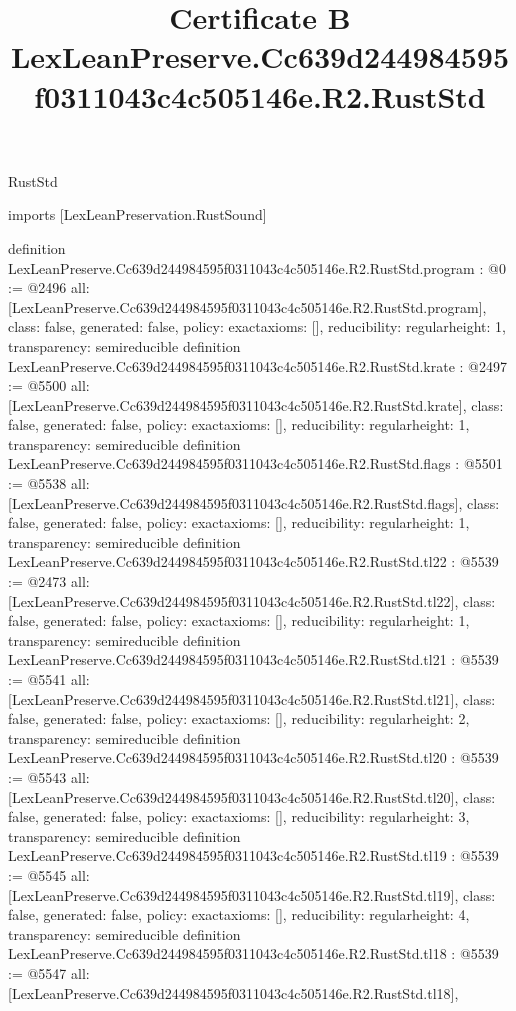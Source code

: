 \begin{lexlean}{RustStd}
\title{Certificate B LexLeanPreserve.Cc639d244984595f0311043c4c505146e.R2.RustStd}
\begin{coremodule}
imports [LexLeanPreservation.RustSound]

definition LexLeanPreserve.Cc639d244984595f0311043c4c505146e.R2.RustStd.program : @0 := @2496 {
  all: [LexLeanPreserve.Cc639d244984595f0311043c4c505146e.R2.RustStd.program],
  class: false,
  generated: false,
  policy: exact{axioms: []},
  reducibility: regular{height: 1},
  transparency: semireducible
}
definition LexLeanPreserve.Cc639d244984595f0311043c4c505146e.R2.RustStd.krate : @2497 := @5500 {
  all: [LexLeanPreserve.Cc639d244984595f0311043c4c505146e.R2.RustStd.krate],
  class: false,
  generated: false,
  policy: exact{axioms: []},
  reducibility: regular{height: 1},
  transparency: semireducible
}
definition LexLeanPreserve.Cc639d244984595f0311043c4c505146e.R2.RustStd.flags : @5501 := @5538 {
  all: [LexLeanPreserve.Cc639d244984595f0311043c4c505146e.R2.RustStd.flags],
  class: false,
  generated: false,
  policy: exact{axioms: []},
  reducibility: regular{height: 1},
  transparency: semireducible
}
definition LexLeanPreserve.Cc639d244984595f0311043c4c505146e.R2.RustStd.tl22 : @5539 := @2473 {
  all: [LexLeanPreserve.Cc639d244984595f0311043c4c505146e.R2.RustStd.tl22],
  class: false,
  generated: false,
  policy: exact{axioms: []},
  reducibility: regular{height: 1},
  transparency: semireducible
}
definition LexLeanPreserve.Cc639d244984595f0311043c4c505146e.R2.RustStd.tl21 : @5539 := @5541 {
  all: [LexLeanPreserve.Cc639d244984595f0311043c4c505146e.R2.RustStd.tl21],
  class: false,
  generated: false,
  policy: exact{axioms: []},
  reducibility: regular{height: 2},
  transparency: semireducible
}
definition LexLeanPreserve.Cc639d244984595f0311043c4c505146e.R2.RustStd.tl20 : @5539 := @5543 {
  all: [LexLeanPreserve.Cc639d244984595f0311043c4c505146e.R2.RustStd.tl20],
  class: false,
  generated: false,
  policy: exact{axioms: []},
  reducibility: regular{height: 3},
  transparency: semireducible
}
definition LexLeanPreserve.Cc639d244984595f0311043c4c505146e.R2.RustStd.tl19 : @5539 := @5545 {
  all: [LexLeanPreserve.Cc639d244984595f0311043c4c505146e.R2.RustStd.tl19],
  class: false,
  generated: false,
  policy: exact{axioms: []},
  reducibility: regular{height: 4},
  transparency: semireducible
}
definition LexLeanPreserve.Cc639d244984595f0311043c4c505146e.R2.RustStd.tl18 : @5539 := @5547 {
  all: [LexLeanPreserve.Cc639d244984595f0311043c4c505146e.R2.RustStd.tl18],
}
\end{coremodule}
\end{lexlean}
